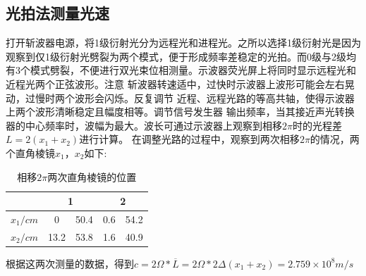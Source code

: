 \documentclass[12pt,a4paper]{article}
\begin{document}
\subsection{光拍法测量光速}
打开斩波器电源，将1级衍射光分为远程光和进程光。之所以选择1级衍射光是因为观察到仅1级衍射光劈裂为两个模式，便于形成频率差稳定的光拍。而0级与2级均有3个模式劈裂，不便进行双光束位相测量。示波器荧光屏上将同时显示远程光和近程光两个正弦波形。注意
斩波器转速适中，过快时示波器上波形可能会左右晃动，过慢时两个波形会闪烁。反复调节
近程、远程光路的等高共轴，使得示波器上两个波形清晰稳定且幅度相等。调节信号发生器
输出频率，当其接近声光转换器的中心频率时，波幅为最大。波长可通过示波器上观察到相移$2\pi$时的光程差$L=2(x_1+x_2)$进行计算。
在调整光路的过程中，观察到两次相移$2\pi$的情况，两个直角棱镜$x_1$，$x_2$如下:
\begin{table}[H]
    \centering
    \begin{tabular}{|c|cc|cc|}
    \hline
       & \multicolumn{2}{c|}{1}           & \multicolumn{2}{c|}{2}          \\ \hline
    $x_1/cm$ & \multicolumn{1}{c|}{0}    & 50.4 & \multicolumn{1}{c|}{0.6} & 54.2 \\ \hline
    $x_2/cm$ & \multicolumn{1}{c|}{13.2} & 53.8 & \multicolumn{1}{c|}{1.6} & 40.9 \\ \hline
    \end{tabular}
    \caption{相移$2\pi$两次直角棱镜的位置}
    \end{table}
根据这两次测量的数据，得到$c=2\Omega*\overline L=2\Omega*2\Delta (x_1+x_2)=2.759\times 10^8m/s$
\end{document}
